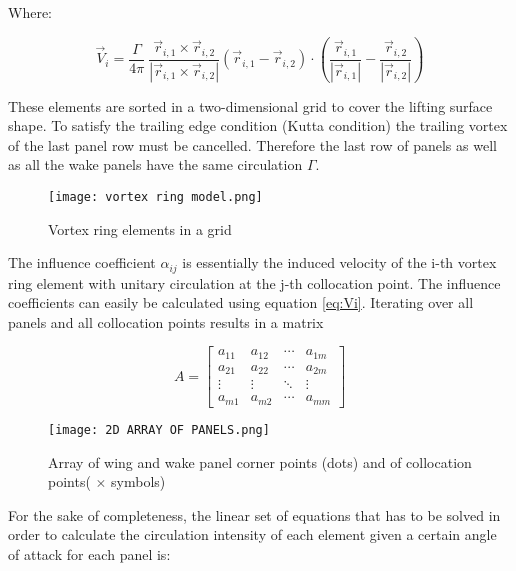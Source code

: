 Where:

\begin{equation}
    \label{eq:Vi}
{\vec{V}}_{i} = \frac{\Gamma}{4\pi}\ \frac{{\vec{r}}_{i,1} \times {\vec{r}}_{i,2}}{\left| {\vec{r}}_{i,1} \times {\vec{r}}_{i,2} \right|}({\vec{r}}_{i,1} - {\vec{r}}_{i,2}) \cdot \left( \frac{{\vec{r}}_{i,1}}{\left| {\vec{r}}_{i,1} \right|} - \frac{{\vec{r}}_{i,2}}{\left| {\vec{r}}_{i,2} \right|} \right)
\end{equation}

These elements are sorted in a two-dimensional grid to cover the lifting
surface shape. To satisfy the trailing edge condition (Kutta condition)
the trailing vortex of the last panel row must be cancelled. Therefore
the last row of panels as well as all the wake panels have the same
circulation $\Gamma$.

\begin{figure}[H]
    \centering
    \texttt{[image: vortex ring model.png]}
    \caption{Vortex ring elements in a grid \cite{katz2001}}
\end{figure}


The influence coefficient $\alpha_{ij}$ is essentially the induced
velocity of the i-th vortex ring element with unitary circulation at the
j-th collocation point. The influence coefficients can easily be
calculated using equation \eqref{eq:Vi}. Iterating over all panels and all
collocation points results in a matrix

\begin{equation}
A = \begin{bmatrix}
a_{11} & a_{12} & \cdots & a_{1m} \\
a_{21} & a_{22} & \cdots & a_{2m} \\
 \vdots & \vdots & \ddots & \vdots \\
a_{m1} & a_{m2} & \cdots & a_{mm}
\end{bmatrix}
\end{equation}

\begin{figure}[H]
  \centering
  \texttt{[image: 2D ARRAY OF PANELS.png]}
  \caption{Array of wing and wake panel corner points (dots) and of collocation points( $\times$ symbols) \cite{katz2001}}
\end{figure}

For the sake of completeness, the linear set of equations that has to be
solved in order to calculate the circulation intensity of each element
given a certain angle of attack for each panel is:

